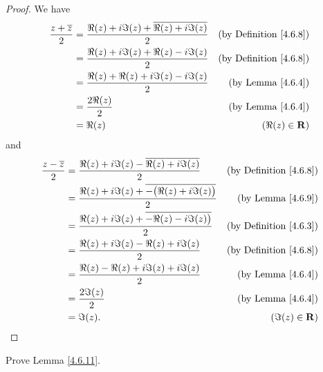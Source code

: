 \begin{proof}
    We have
    \begin{align*}
        \frac{z + \overline{z}}{2} & = \frac{\Re(z) + i \Im(z) + \overline{\Re(z) + i \Im(z)}}{2} & \text{(by Definition \ref{4.6.8})} \\
                                   & = \frac{\Re(z) + i \Im(z) + \Re(z) - i \Im(z)}{2}            & \text{(by Definition \ref{4.6.8})} \\
                                   & = \frac{\Re(z) + \Re(z) + i \Im(z) - i \Im(z)}{2}            & \text{(by Lemma \ref{4.6.4})}      \\
                                   & = \frac{2 \Re(z)}{2}                                         & \text{(by Lemma \ref{4.6.4})}      \\
                                   & = \Re(z)                                                     & (\Re(z) \in \mathbf{R})
    \end{align*}
    and
    \begin{align*}
        \frac{z - \overline{z}}{2} & = \frac{\Re(z) + i \Im(z) - \overline{\Re(z) + i \Im(z)}}{2}            & \text{(by Definition \ref{4.6.8})} \\
                                   & = \frac{\Re(z) + i \Im(z) + \overline{-\big(\Re(z) + i \Im(z)\big)}}{2} & \text{(by Lemma \ref{4.6.9})}      \\
                                   & = \frac{\Re(z) + i \Im(z) + \overline{-\Re(z) - i \Im(z)\big)}}{2}      & \text{(by Definition \ref{4.6.3})} \\
                                   & = \frac{\Re(z) + i \Im(z) - \Re(z) + i \Im(z)}{2}                       & \text{(by Definition \ref{4.6.8})} \\
                                   & = \frac{\Re(z) - \Re(z) + i \Im(z) + i \Im(z)}{2}                       & \text{(by Lemma \ref{4.6.4})}      \\
                                   & = \frac{2 \Im(z)}{2}                                                    & \text{(by Lemma \ref{4.6.4})}      \\
                                   & = \Im(z).                                                               & (\Im(z) \in \mathbf{R})
    \end{align*}
\end{proof}

\begin{exercise}\label{ex 4.6.6}
    Prove Lemma \ref{4.6.11}.
\end{exercise}

